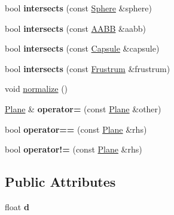 \begin{DoxyCompactItemize}
bool {\bfseries intersects} (const \hyperlink{classdrider_s_d_k_1_1_sphere}{Sphere} \&sphere)
\item 
\mbox{\label{classdrider_s_d_k_1_1_plane_a5d83ba5026cdff701430118eec2abe60}} 
bool {\bfseries intersects} (const \hyperlink{classdrider_s_d_k_1_1_a_a_b_b}{A\+A\+BB} \&aabb)
\item 
\mbox{\label{classdrider_s_d_k_1_1_plane_a926d71fd601ac1407f18134327e18b61}} 
bool {\bfseries intersects} (const \hyperlink{classdrider_s_d_k_1_1_capsule}{Capsule} \&capsule)
\item 
\mbox{\label{classdrider_s_d_k_1_1_plane_aed121f4da95cb30477c49b59ff5e7ec4}} 
bool {\bfseries intersects} (const \hyperlink{classdrider_s_d_k_1_1_frustrum}{Frustrum} \&frustrum)
\item 
void \hyperlink{classdrider_s_d_k_1_1_plane_ac8540b5c993e35b41baac2147fcbbc00}{normalize} ()
\item 
\mbox{\label{classdrider_s_d_k_1_1_plane_a17bc82b2e68e62c492b6698c84a90039}} 
\hyperlink{classdrider_s_d_k_1_1_plane}{Plane} \& {\bfseries operator=} (const \hyperlink{classdrider_s_d_k_1_1_plane}{Plane} \&other)
\item 
\mbox{\label{classdrider_s_d_k_1_1_plane_afe19f5d245e70e16181cfab7172a2301}} 
bool {\bfseries operator==} (const \hyperlink{classdrider_s_d_k_1_1_plane}{Plane} \&rhs)
\item 
\mbox{\label{classdrider_s_d_k_1_1_plane_a8e8e7ac10a3a8445bef69e7a97aa9bc8}} 
bool {\bfseries operator!=} (const \hyperlink{classdrider_s_d_k_1_1_plane}{Plane} \&rhs)
\end{DoxyCompactItemize}
\subsection*{Public Attributes}
\begin{DoxyCompactItemize}
\item 
\mbox{\label{classdrider_s_d_k_1_1_plane_a1c1e1e699f4f15d5930f09115de0de11}} 
float {\bfseries d}
\end{DoxyCompactItemize}


